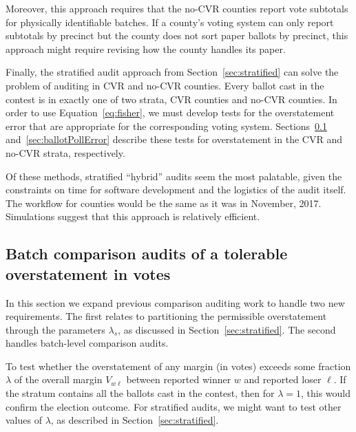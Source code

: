 \documentclass[runningheads]{llncs}
\begin{document}
Moreover, this approach requires that the no-CVR counties report vote subtotals
for physically identifiable batches.
If a county's voting system can only report subtotals by precinct but 
the county does not sort paper ballots by
precinct, this approach might require revising how the county handles its
paper.

Finally, the stratified audit approach from Section~\ref{sec:stratified} can solve the problem of auditing in CVR and no-CVR counties.
Every ballot cast in the contest is in exactly one of two strata, CVR counties and no-CVR counties. 
In order to use Equation~\ref{eq:fisher}, we must develop tests for the overstatement error that are appropriate for the
corresponding voting system.
Sections~\ref{sec:comparisonError} and~\ref{sec:ballotPollError} describe these tests for overstatement in the CVR and no-CVR strata,
respectively.

Of these methods, stratified ``hybrid'' audits seem the most palatable,
given the constraints on time for software development and the logistics
of the audit itself. 
The workflow for counties would be the same as it was in November, 2017.
Simulations suggest that this approach is relatively efficient.




%
\subsection{Batch comparison audits of a tolerable overstatement in votes}
\label{sec:comparisonError}

In this section we expand previous comparison auditing work to handle two new requirements.  
The first relates to partitioning the permissible overstatement
through the parameters $\lambda_s$, as discussed in Section~\ref{sec:stratified}. 
The second handles batch-level comparison audits.

To test whether the overstatement of any margin
(in votes) exceeds some fraction $\lambda$ of the overall margin $V_{w\ell}$ between
reported winner $w$ and reported loser $\ell$.
If the stratum contains all the ballots cast in the contest, then for $\lambda = 1$, this 
would confirm the election outcome.
For stratified audits, we might want to test other values of $\lambda$, as described in Section~\ref{sec:stratified}.
\end{document}
